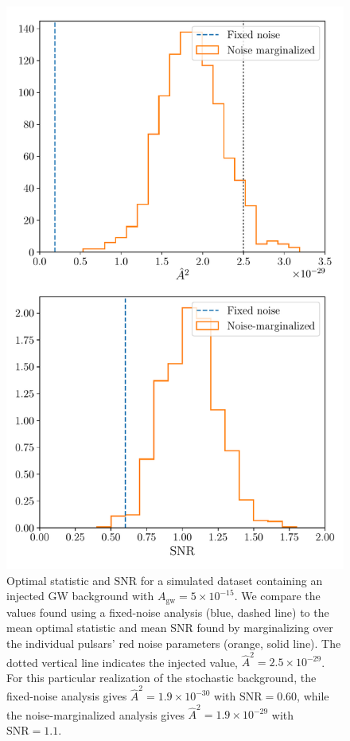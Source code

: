 \documentclass[twocolumn,aps,prd,superscriptaddress]{revtex4-1}
\newcommand{\Agw}{\ensuremath{A_\mathrm{gw}}}
\begin{document}
\begin{figure}[ht]
	\includegraphics[width=\columnwidth]{plots/os_dataset50.pdf}
	\caption{Optimal statistic and SNR for a simulated dataset 
			containing an injected GW background with $\Agw = 5\times10^{-15}$. 
			We compare the values found using a fixed-noise analysis (blue, dashed line) to the 
			mean optimal statistic and mean SNR found by marginalizing over 
			the individual pulsars' red noise parameters (orange, solid line). 
			The dotted vertical line indicates the injected value, $\hat{A}^2 = 2.5 \times 10^{-29}$. 
			For this particular realization of the stochastic background, the fixed-noise analysis 
			gives $\hat{A}^2 = 1.9 \times 10^{-30}$ with $\mathrm{SNR} = 0.60$, 
			while the noise-marginalized analysis gives $\hat{A}^2 = 1.9\times10^{-29}$ with $\mathrm{SNR} = 1.1$.}
	\label{fig:os_dataset_sample}
\end{figure}
\end{document}
